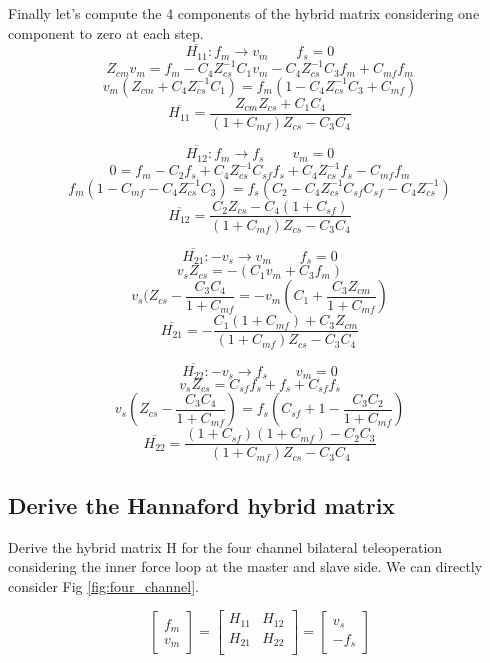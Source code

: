\documentclass[a4paper,12pt]{article}
\begin{document}
\noindent Finally let's compute the 4 components of the hybrid matrix considering one component to zero at each step.
\[
    \overline{H_{11}} : f_m \rightarrow v_m \qquad f_s = 0
    \]\[
    Z_{cm}v_m = f_m - C_4Z_{cs}^{-1}C_1v_m - C_4Z_{cs}^{-1}C_3f_m + C_{mf}f_m
\]\[
    v_m(Z_{cm}+C_4Z_{cs}^{-1}C_1) = f_m(1-C_4Z_{cs}^{-1}C_3 + C_{mf})
    \]\[
    \overline{H_{11}} = \frac{Z_{cm}Z_{cs}+C_1C_4}{(1+C_{mf})Z_{cs} - C_3C_4}
\]


\bigskip

\[
    \overline{H_{12}} : f_m \rightarrow f_s \qquad v_m = 0
    \]\[
    0 = f_m -C_2f_s +C_4Z_{cs}^{-1}C_{sf}f_s + C_4Z_{cs}^{-1}f_s - C_{mf}f_m
\]\[
    f_m(1-C_{mf}-C_4Z_{cs}^{-1}C_3) = f_s(C_2-C_4Z_{cs}^{-1}C_{sf}C_{sf}-C_4Z_{cs}^{-1})
    \]\[
    \overline{H_{12}} = \frac{C_2Z_{cs}-C_4(1+C_{sf})}{(1+C_{mf})Z_{cs} - C_3C_4}
\]

\bigskip

\[
    \overline{H_{21}} : -v_s \rightarrow v_m \qquad f_s = 0
    \]\[
    v_sZ_{cs} = -(C_1v_m + C_3f_m)
\]\[
    v_s(Z_{cs} - \frac{C_3C_4}{1+C_{mf}} = -v_m(C_1 + \frac{C_3Z_{cm}}{1+C_{mf}})
    \]\[
    \overline{H_{21}} = -\frac{C_1(1+C_{mf}) + C_3Z_{cm}}{(1+C_{mf})Z_{cs} - C_3C_4}
\]


\bigskip

\[
    \overline{H_{22}} : -v_s \rightarrow f_s \qquad v_m = 0
\]\[
    v_sZ_{cs} = C_{sf}f_s + f_s + C_{sf}f_s
\]\[
    v_s(Z_{cs}-\frac{C_3C_4}{1+C_{mf}}) = f_s(C_{sf} + 1 - \frac{C_3C_2}{1+C_{mf}})
\]\[
    \overline{H_{22}} = \frac{(1+C_{sf})(1+C_{mf})-C_2C_3}{(1+C_{mf})Z_{cs}-C_3C_4}
\]

\subsection{Derive the Hannaford hybrid matrix}
Derive the hybrid matrix H for the four channel bilateral teleoperation considering the inner force loop at the master and slave side. We can directly consider Fig \ref{fig:four_channel}.

\[
\begin{bmatrix}  f_m \\ v_m \end{bmatrix} = \begin{bmatrix}
    H_{11} & H_{12} \\
    H_{21} & H_{22} \\
\end{bmatrix} = \begin{bmatrix}  v_s \\ -f_s \end{bmatrix}
\]
\end{document}
